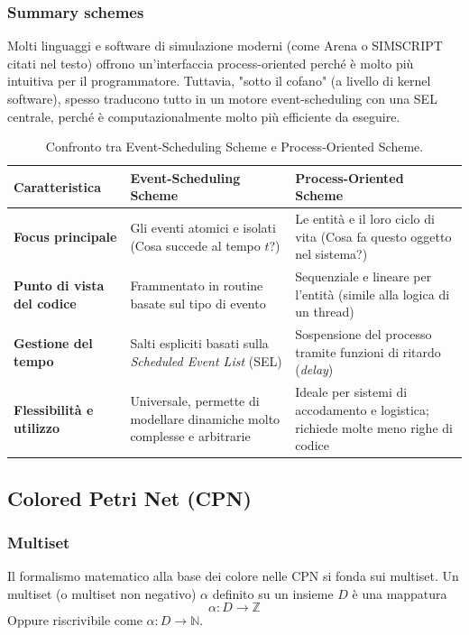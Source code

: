 \subsubsection{Summary schemes}
Molti linguaggi e software di simulazione moderni (come Arena o SIMSCRIPT citati nel testo) offrono un'interfaccia process-oriented perché è molto più intuitiva per il programmatore. Tuttavia, "sotto il cofano" (a livello di kernel software), spesso traducono tutto in un motore event-scheduling con una SEL centrale, perché è computazionalmente molto più efficiente da eseguire.

\begin{table}[H]
	\centering
	\label{tab:scheduling_schemes}
	\begin{tabularx}{\textwidth}{l X X}
		\toprule
		\textbf{Caratteristica} & \textbf{Event-Scheduling Scheme} & \textbf{Process-Oriented Scheme} \\
		\midrule
		\textbf{Focus principale} & Gli eventi atomici e isolati (Cosa succede al tempo $t$?) & Le entità e il loro ciclo di vita (Cosa fa questo oggetto nel sistema?) \\
		\addlinespace
		\textbf{Punto di vista del codice} & Frammentato in routine basate sul tipo di evento & Sequenziale e lineare per l'entità (simile alla logica di un thread) \\
		\addlinespace
		\textbf{Gestione del tempo} & Salti espliciti basati sulla \emph{Scheduled Event List} (SEL) & Sospensione del processo tramite funzioni di ritardo (\emph{delay}) \\
		\addlinespace
		\textbf{Flessibilità e utilizzo} & Universale, permette di modellare dinamiche molto complesse e arbitrarie & Ideale per sistemi di accodamento e logistica; richiede molte meno righe di codice \\
		\bottomrule
	\end{tabularx}
	
	\caption{Confronto tra Event-Scheduling Scheme e Process-Oriented Scheme.}
\end{table}

\subsection{Colored Petri Net (CPN)}

\subsubsection{Multiset}
Il formalismo matematico alla base dei colore nelle CPN si fonda sui multiset. Un multiset (o multiset non negativo) $\alpha$ definito su un insieme $D$ è una mappatura
\begin{equation}
	\alpha : D \rightarrow \mathbb{Z}
\end{equation}
Oppure riscrivibile come $\alpha : D \rightarrow \mathbb{N}$.

